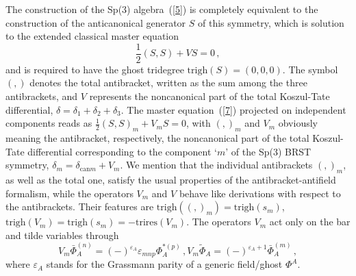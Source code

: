 \documentclass[a4paper,10pt]{article}
\begin{document}
The construction of the Sp(3) algebra~(\ref{5}) is completely equivalent to
the construction of the anticanonical generator $S$ of this symmetry, which
is solution to the extended classical master equation 
\begin{equation}
\label{7}
\frac{1}{2}\left( S,S\right) +VS=0\,,
\end{equation}
and is required to have the ghost tridegree $\mathrm{trigh}\left( S\right)
=\left( 0,0,0\right) $. The symbol $\left( ,\right) $ denotes the total
antibracket, written as the sum among the three antibrackets, and $V$
represents the noncanonical part of the total Koszul-Tate differential, $%
\delta =\delta _{1}+\delta _{2}+\delta _{3}$.
The master equation~(\ref{7})
projected on independent components reads as $\frac{1}{2}\left( S,S\right)
_{m}+V_{m}S=0$, with $\left( ,\right) _{m}$ and $V_{m}$ obviously meaning
the antibracket, respectively, the noncanonical part of the total
Koszul-Tate differential corresponding to the component `$m$' of the Sp(3)
BRST symmetry, $\delta _{m}=\delta _{\mathrm{can}m}+V_{m}$. 
We mention that the individual antibrackets $\left( ,\right) _{m}$, as
well as the total one, satisfy the usual properties of the 
antibracket-antifield formalism, while the operators $V_{m}$ and $V$
behave like derivations with respect to the antibrackets. Their features
are $\mathrm{trigh}\left( \left( ,\right) _{m} \right) =
\mathrm{trigh}\left( s_{m}\right) $, $\mathrm{trigh}\left( V_{m}\right) =
\mathrm{trigh}\left( s_{m}\right) =-\mathrm{trires}\left( V_{m}\right) $.
The operators $%
V_{m}$ act only on the bar and tilde variables through 
\begin{equation}
\label{20}
V_{m}\bar{\Phi}_{A}^{(n)}=\left( -\right) ^{\varepsilon _{A}}\varepsilon
_{mnp}\Phi _{A}^{*(p)}\,, V_{m}\tilde{\Phi}_{A}=
\left( -\right) ^{\varepsilon
_{A}+1}\bar{\Phi}_{A}^{(m)}\,,
\end{equation}
where $\varepsilon _{A}$ stands for the Grassmann parity of a generic
field/ghost $\Phi ^{A}$.
\end{document}
